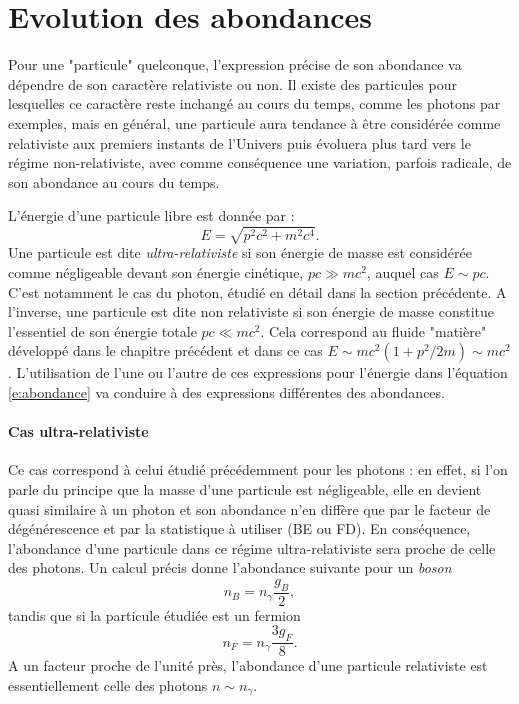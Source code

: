 \section{Evolution des abondances}
Pour une "particule" quelconque, l'expression précise de son abondance va dépendre de son caractère relativiste ou non. Il existe des particules pour lesquelles ce caractère reste inchangé au cours du temps, comme les photons par exemples, mais en général, une particule aura tendance à être considérée comme relativiste aux premiers instants de l'Univers puis évoluera plus tard vers le régime non-relativiste, avec comme conséquence une variation, parfois radicale, de son abondance au cours du temps.

L'énergie d'une particule libre est donnée par :
\begin{equation}
E=\sqrt{p^2c^2+m^2c^4}.
\end{equation}
 Une particule est dite \textit{ultra-relativiste} si son énergie de masse est considérée comme négligeable devant son énergie cinétique, $pc\gg mc^2$, auquel cas $E\sim pc$. C'est notamment le cas du photon, étudié en détail dans la section précédente. A l'inverse, une particule est dite non relativiste si son énergie de masse constitue l'essentiel de son énergie totale $pc \ll mc^2$. Cela correspond au fluide "matière" développé dans le chapitre précédent et dans ce cas $E\sim mc^2 (1+ p^2/2m) \sim mc^2$. L'utilisation de l'une ou l'autre de ces expressions pour l'énergie dans l'équation \ref{e:abondance} va conduire à des expressions différentes des abondances.
 
 \paragraph{Cas ultra-relativiste}
Ce cas correspond à celui étudié précédemment pour les photons : en effet, si l'on parle du principe que la masse d'une particule est négligeable, elle en devient quasi similaire à un photon et son abondance n'en diffère que par le facteur de dégénérescence et par la statistique à utiliser (BE ou FD). En conséquence, l'abondance d'une particule dans ce régime ultra-relativiste sera proche de celle des photons. Un calcul précis donne l'abondance suivante pour un \textit{boson}
\begin{equation}
n_B=n_\gamma\frac{g_B}{2},
\end{equation}
tandis que si la particule étudiée est un fermion
\begin{equation}
n_F=n_\gamma\frac{3g_F}{8}.
\end{equation}
A un facteur proche de l'unité près, l'abondance d'une particule relativiste est essentiellement celle des photons $n\sim n_\gamma$.

